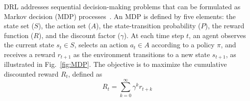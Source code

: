




DRL addresses sequential decision-making problems that can be formulated as Markov decision (MDP) processes~\cite{712192}. 
An MDP is defined by five elements: the state set ($S$), the action set ($A$), the state-transition probability ($P$), the reward function ($R$), and the discount factor ($\gamma$). 
At each time step $t$, an agent observes the current state $s_t \in S$, selects an action $a_t \in A$ according to a policy $\pi$, and receives a reward $r_{t+1}$ as the environment transitions to a new state $s_{t+1}$, as illustrated in Fig.~\ref{fig:MDP}. 
The objective is to maximize the cumulative discounted reward $R_t$, defined as
\begin{equation}
R_t = \sum_{k=0}^{\infty} \gamma^{k} r_{t+k}
\end{equation}

